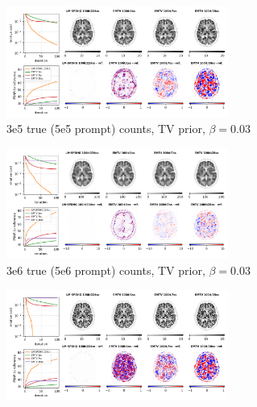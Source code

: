 \begin{figure}
  \centering
  \begin{subfigure}[]{1.0\textwidth}
    \centering
    \includegraphics[width=0.8\textwidth]{./figs/brain2d_counts_3.0E+05_seed_1_beta_3.0E-02_prior_TV_niter_ref_20000_fwhm_4.5_4.5_niter_100_emtv.png}
    \caption{3e5 true (5e5 prompt) counts, TV prior, $\beta = 0.03$}
  \end{subfigure}
  \vfill
  \begin{subfigure}[]{1.0\textwidth}
    \centering
    \includegraphics[width=0.8\textwidth]{./figs/brain2d_counts_3.0E+06_seed_1_beta_3.0E-02_prior_TV_niter_ref_20000_fwhm_4.5_4.5_niter_100_emtv.png}
    \caption{3e6 true (5e6 prompt) counts, TV prior, $\beta = 0.03$}
  \end{subfigure}
  \vfill
  \begin{subfigure}[]{1.0\textwidth}
    \centering
    \includegraphics[width=0.8\textwidth]{./figs/brain2d_counts_3.0E+05_seed_1_beta_1.0E-01_prior_DTV_niter_ref_20000_fwhm_4.5_4.5_niter_100_emtv.png}

\end{subfigure}
\end{figure}
